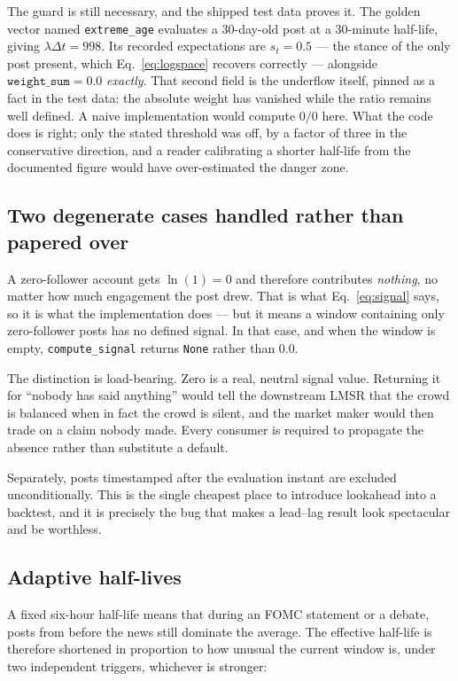 \documentclass[11pt]{article}
\newcommand{\code}[1]{\texttt{\small #1}}
\begin{document}
The guard is still necessary, and the shipped test data proves it. The golden
vector named \code{extreme\_age} evaluates a 30-day-old post at a 30-minute
half-life, giving $\lambda \Delta t = 998$. Its recorded expectations are
$s_t = 0.5$ --- the stance of the only post present, which
Eq.~\ref{eq:logspace} recovers correctly --- alongside
$\texttt{weight\_sum} = 0.0$ \emph{exactly}. That second field is the underflow
itself, pinned as a fact in the test data: the absolute weight has vanished
while the ratio remains well defined. A naive implementation would compute
$0/0$ here. What the code does is right; only the stated threshold was off, by a
factor of three in the conservative direction, and a reader calibrating a
shorter half-life from the documented figure would have over-estimated the
danger zone.

\subsection{Two degenerate cases handled rather than papered over}

A zero-follower account gets $\ln(1) = 0$ and therefore contributes
\emph{nothing}, no matter how much engagement the post drew. That is what
Eq.~\ref{eq:signal} says, so it is what the implementation does --- but it means
a window containing only zero-follower posts has no defined signal. In that
case, and when the window is empty, \code{compute\_signal} returns \code{None}
rather than $0.0$.

The distinction is load-bearing. Zero is a real, neutral signal value. Returning
it for ``nobody has said anything'' would tell the downstream LMSR that the
crowd is balanced when in fact the crowd is silent, and the market maker would
then trade on a claim nobody made. Every consumer is required to propagate the
absence rather than substitute a default.

Separately, posts timestamped after the evaluation instant are excluded
unconditionally. This is the single cheapest place to introduce lookahead into a
backtest, and it is precisely the bug that makes a lead--lag result look
spectacular and be worthless.

\subsection{Adaptive half-lives}

A fixed six-hour half-life means that during an FOMC statement or a debate,
posts from before the news still dominate the average. The effective half-life
is therefore shortened in proportion to how unusual the current window is, under
two independent triggers, whichever is stronger:
\end{document}
